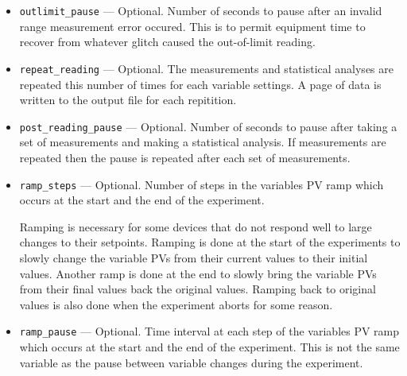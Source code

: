 \begin{itemize}
\begin{itemize}
\begin{itemize}
   \item {\verb+outlimit_pause+} --- Optional. Number of seconds to
      pause after an invalid range measurement error occured. This is
      to permit equipment time to recover from whatever glitch caused
      the out-of-limit reading.

   \item {\verb+repeat_reading+} --- Optional. The measurements and
      statistical analyses are repeated this number of times for each
      variable settings. A page of data is written to the output file
      for each repitition.

   \item {\verb+post_reading_pause+} --- Optional. Number of seconds
      to pause after taking a set of measurements and making a
      statistical analysis.  If measurements are repeated then the
      pause is repeated after each set of measurements.

   \item {\verb+ramp_steps+} --- Optional. Number of steps in the
      variables PV ramp which occurs at the start and the end of the
      experiment.

      Ramping is necessary for some devices that do not respond well
      to large changes to their setpoints. Ramping is done at the
      start of the experiments to slowly change the variable PVs from
      their current values to their initial values. Another ramp is
      done at the end to slowly bring the variable PVs from their
      final values back the original values. Ramping back to original
      values is also done when the experiment aborts for some reason.

   \item {\verb+ramp_pause+} --- Optional. Time interval at each step
      of the variables PV ramp which occurs at the start and the end
      of the experiment. This is not the same variable as the pause
      between variable changes during the experiment.
\end{itemize}


\end{itemize}
\end{itemize}
